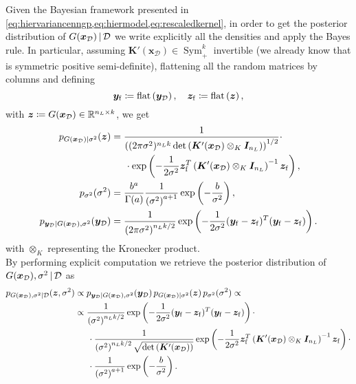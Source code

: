 Given the Bayesian framework presented in \cref{eq:hiervariancenngp,eq:hiermodel,eq:rescaledkernel}, in order to get the posterior distribution of $G(\bm{x}_{\mathcal{D}}) \, | \, \mathcal{D}$ we write explicitly all the densities and apply the Bayes rule. 
In particular, assuming $\bm{K}'(\bm{x}_{\mathcal{D}}) \in \operatorname{Sym}_+^{k}$ invertible (we already know that is symmetric positive semi-definite), flattening all the random matrices by columns and defining
\begin{equation*}
	\bm{y}_{\mathrm{f}} \coloneqq \operatorname{flat}\left(\bm{y}_{\mathcal{D}}\right), \quad \bm{z}_{\mathrm{f}} \coloneqq \operatorname{flat}\left(\bm{z}\right),
\end{equation*}
with $\bm{z} \coloneqq G(\bm{x}_{\mathcal{D}}) \in \mathbb{R}^{n_L \times k}$, we get
\begin{equation*}
	\begin{aligned}	
		p_{G(\bm{x}_{\mathcal{D}}) | \sigma^2}(\bm{z}) & = \frac{1}{\left((2\pi \sigma^2)^{n_L k} \operatorname{det}\left(\bm{K}'(\bm{x}_{\mathcal{D}}) \otimes_K \bm{I}_{n_L}\right)\right)^{1/2}} \cdot \\
		& \kern14.65pt \cdot \operatorname{exp}\left(-\frac{1}{2\sigma^2} \bm{z}_{\mathrm{f}}^T \left(\bm{K}'(\bm{x}_{\mathcal{D}}) \otimes_K \bm{I}_{n_L}\right)^{-1} \bm{z}_{\mathrm{f}}\right), \\
		p_{\sigma^2}(\sigma^2) & = \frac{b^a}{\Gamma(a)} \frac{1}{\left(\sigma^2\right)^{a + 1}} \operatorname{exp}\left(-\frac{b}{\sigma^2}\right), \\
		p_{\bm{y}_{\mathcal{D}} | G(\bm{x}_{\mathcal{D}}), \sigma^2}(\bm{y}_{\mathcal{D}}) &= \frac{1}{\left(2\pi\sigma^2\right)^{n_L k / 2}} \operatorname{exp}\left(-\frac{1}{2 \sigma^2} (\bm{y}_{\mathrm{f}} - \bm{z}_{\mathrm{f}})^T (\bm{y}_{\mathrm{f}} - \bm{z}_{\mathrm{f}})\right).
	\end{aligned}
\end{equation*}
with $\otimes_K$ representing the Kronecker product. \\
By performing explicit computation we retrieve the posterior distribution of $G(\bm{x}_{\mathcal{D}}), \sigma^2 \, | \, \mathcal{D}$ as
\begin{equation*}
	\begin{aligned}
		p_{G(\bm{x}_{\mathcal{D}}), \sigma^2 | \mathcal{D}}(\bm{z}, \sigma^2) & \propto p_{\bm{y}_{\mathcal{D}} | G(\bm{x}_{\mathcal{D}}), \sigma^2}(\bm{y}_{\mathcal{D}}) \, p_{G(\bm{x}_{\mathcal{D}}) | \sigma^2}(\bm{z}) \, p_{\sigma^2}(\sigma^2) \propto \\
		& \propto \frac{1}{\left(\sigma^2\right)^{n_L k / 2}} \operatorname{exp}\left(-\frac{1}{2\sigma^2} (\bm{y}_{\mathrm{f}} - \bm{z}_{\mathrm{f}})^T (\bm{y}_{\mathrm{f}} - \bm{z}_{\mathrm{f}})\right) \cdot \\
		& \kern14.65pt \cdot \frac{1}{\left(\sigma^2\right)^{n_L k / 2} \sqrt{\operatorname{det}\left(\bm{K}'(\bm{x}_{\mathcal{D}})\right)}} \operatorname{exp}\left(-\frac{1}{2 \sigma^2} \bm{z}_{\mathrm{f}}^T \left(\bm{K}'(\bm{x}_{\mathcal{D}}) \otimes_K \bm{I}_{n_L}\right)^{-1} \bm{z}_{\mathrm{f}}\right) \cdot \\
		& \kern14.65pt \cdot \frac{1}{\left(\sigma^2\right)^{a + 1}} \operatorname{exp}\left(-\frac{b}{\sigma^2}\right).
	\end{aligned}
\end{equation*}
